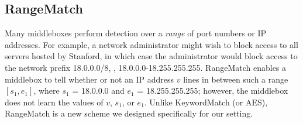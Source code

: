 %
%
%
%
%
%
%
%
%
%
%
%

\subsection{RangeMatch } \label{sec:range}

Many middleboxes perform detection over a {\it range} of port numbers or IP addresses. For example, a network administrator might wish to block access to all servers hosted by Stanford, in which case the administrator would block access to the network prefix 18.0.0.0/8, \ie{}, 18.0.0.0-18.255.255.255. RangeMatch enables a middlebox to tell whether or not an IP address $v$ lines in between such a range $[s_1, e_1]$, where $s_1$ = 18.0.0.0 and $e_1$ = 18.255.255.255; however, the middlebox does not learn the values of $v$, $s_1$, or $e_1$.
Unlike KeywordMatch (or AES), RangeMatch is a new scheme we designed specifically for our setting.

